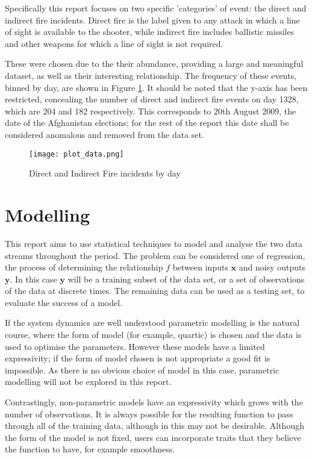 \documentclass[a4paper,11pt]{report}
\begin{document}
Specifically this report focuses on two specific 'categories' of event: the direct and indirect fire incidents. Direct fire is the label given to any attack in which a line of sight is available to the shooter, while indirect fire includes ballistic missiles and other weapons for which a line of sight is not required.

These were chosen due to the their abundance, providing a large and meaningful dataset, as well as their interesting relationship. The frequency of these events, binned by day, are shown in Figure \ref{fig:sigactsdata}. It should be noted that the y-axis has been restricted, concealing the number of direct and indirect fire events on day 1328, which are 204 and 182 respectively. This corresponds to 20th August 2009, the date of the Afghanistan elections; for the rest of the report this date shall be considered anomalous and removed from the data set.

\begin{figure}
\centering
\texttt{[image: plot\_data.png]}
\caption{Direct and Indirect Fire incidents by day}
\label{fig:sigactsdata}
\end{figure}

\section{Modelling}

This report aims to use statistical techniques to model and analyse the two data streams throughout the period. The problem can be considered one of regression, the process of determining the relationship \(f\) between inputs \(\mathbf{x}\) and noisy outputs \(\mathbf{y}\). In this case \(\mathbf{y}\) will be a training subset of the data set, or a set of observations of the data at discrete times. The remaining data can be used as a testing set, to evaluate the success of a model. \par

If the system dynamics are well understood parametric modelling is the natural course, where the form of model (for example, quartic) is chosen and the data is used to optimise the parameters. However these models have a limited expressivity; if the form of model chosen is not appropriate a good fit is impossible. As there is no obvious choice of model in this case, parametric modelling will not be explored in this report. \par

Contrastingly, non-parametric models have an expressivity which grows with the number of observations. It is always possible for the resulting function to pass through all of the training data, although in this may not be desirable. Although the form of the model is not fixed, users can incorporate traits that they believe the function to have, for example smoothness. \par
\end{document}
